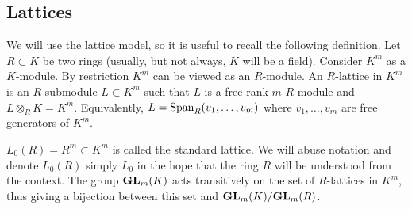 \documentclass[draft]{article}
\begin{document}
\subsection{Lattices}
\label{ss:lat}
We will use the lattice model, so it is useful to recall the following definition. Let $ R \subset K$ be two rings (usually, but not always, $K$ will be a field). 
Consider $ K^m $ as a $K$-module. By restriction $ K^m$ can be viewed as an $R$-module.  An $R$-lattice in $K^m$ 
is an $R$-submodule $ L \subset K^m$ such that $ L $ is a free rank $ m $ $R$-module and $ L \otimes_R K = K^m $.  Equivalently, $ L = \operatorname{Span}_R(v_1, \dots, v_m)$ where $v_1, \dots, v_m$ are free generators of $K^m$. 
% 
\begin{comment}
\jcom{Maybe need that both $K$ and $R$ are integral domains and have the same field of fractions?} 
\acom{Roger has proved that what is written is ok.}
\rcom{Here's my argument: If $L \subset K^m$ is a free rank $m$ $R$-module and $L \otimes K = K^m$, then it's clear we that $L$ is generated by $m$ generators $v_1,\dots,v_m$ over $R$. Since $L\otimes K = K^m$, these also generate $K^m$ over $K$. Then we have a surjective map $K^m \twoheadrightarrow K^m$ given by sending a basis of $K^m$ to the generators $v_1,\dots,v_m$. Since any surjective endomorphism of finite $K$-modules is injective, the $v_1,\dots,v_m$ form a basis. I think the only thing that is needed is that the rings are commutative.}
\jcom{Great.}
\end{comment} 

$ L_0(R) = R^m \subset K^m $ is called the standard lattice. 
We will abuse notation and denote $L_0(R)$ simply $L_0$ in the hope that the ring $R$ will be understood from the context. 
The group ${\mathbf{GL}}_m(K) $ acts transitively on the set of $R$-lattices in $K^m$, thus giving a bijection between 
this set and ${\mathbf{GL}}_m(K)/{\mathbf{GL}}_m(R)$. 
\end{document}
